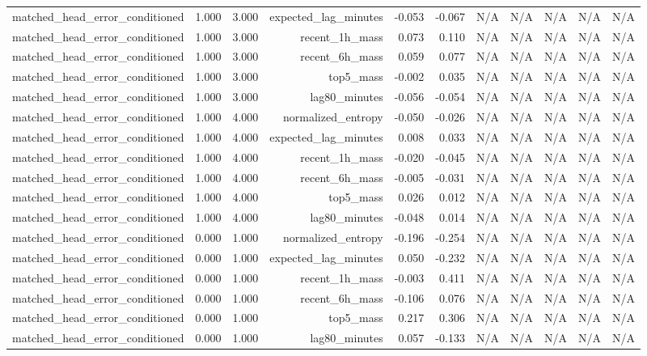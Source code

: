 \begin{table}[h!]
\begin{tabular}{lrrrrrrrrrr}
matched\_head\_error\_conditioned & 1.000 & 3.000 & expected\_lag\_minutes & -0.053 & -0.067 & N/A & N/A & N/A & N/A & N/A \\
matched\_head\_error\_conditioned & 1.000 & 3.000 & recent\_1h\_mass & 0.073 & 0.110 & N/A & N/A & N/A & N/A & N/A \\
matched\_head\_error\_conditioned & 1.000 & 3.000 & recent\_6h\_mass & 0.059 & 0.077 & N/A & N/A & N/A & N/A & N/A \\
matched\_head\_error\_conditioned & 1.000 & 3.000 & top5\_mass & -0.002 & 0.035 & N/A & N/A & N/A & N/A & N/A \\
matched\_head\_error\_conditioned & 1.000 & 3.000 & lag80\_minutes & -0.056 & -0.054 & N/A & N/A & N/A & N/A & N/A \\
matched\_head\_error\_conditioned & 1.000 & 4.000 & normalized\_entropy & -0.050 & -0.026 & N/A & N/A & N/A & N/A & N/A \\
matched\_head\_error\_conditioned & 1.000 & 4.000 & expected\_lag\_minutes & 0.008 & 0.033 & N/A & N/A & N/A & N/A & N/A \\
matched\_head\_error\_conditioned & 1.000 & 4.000 & recent\_1h\_mass & -0.020 & -0.045 & N/A & N/A & N/A & N/A & N/A \\
matched\_head\_error\_conditioned & 1.000 & 4.000 & recent\_6h\_mass & -0.005 & -0.031 & N/A & N/A & N/A & N/A & N/A \\
matched\_head\_error\_conditioned & 1.000 & 4.000 & top5\_mass & 0.026 & 0.012 & N/A & N/A & N/A & N/A & N/A \\
matched\_head\_error\_conditioned & 1.000 & 4.000 & lag80\_minutes & -0.048 & 0.014 & N/A & N/A & N/A & N/A & N/A \\
matched\_head\_error\_conditioned & 0.000 & 1.000 & normalized\_entropy & -0.196 & -0.254 & N/A & N/A & N/A & N/A & N/A \\
matched\_head\_error\_conditioned & 0.000 & 1.000 & expected\_lag\_minutes & 0.050 & -0.232 & N/A & N/A & N/A & N/A & N/A \\
matched\_head\_error\_conditioned & 0.000 & 1.000 & recent\_1h\_mass & -0.003 & 0.411 & N/A & N/A & N/A & N/A & N/A \\
matched\_head\_error\_conditioned & 0.000 & 1.000 & recent\_6h\_mass & -0.106 & 0.076 & N/A & N/A & N/A & N/A & N/A \\
matched\_head\_error\_conditioned & 0.000 & 1.000 & top5\_mass & 0.217 & 0.306 & N/A & N/A & N/A & N/A & N/A \\
matched\_head\_error\_conditioned & 0.000 & 1.000 & lag80\_minutes & 0.057 & -0.133 & N/A & N/A & N/A & N/A & N/A \\

\end{tabular}
\end{table}
